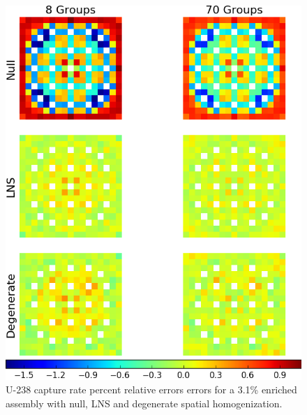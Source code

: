 \begin{figure}[h!]
\centering
\includegraphics[width=\linewidth]{figures/patterns/lns/assm-31/capt-err}
\vspace{2mm}
\caption[U-238 capture rate errors for a 3.1\% enriched assembly]{U-238 capture rate percent relative errors errors for a 3.1\% enriched assembly with null, \ac{LNS} and degenerate spatial homogenization.}
\label{fig:chap9-assm-3.1-lns-capt-err}
\end{figure}

\clearpage

